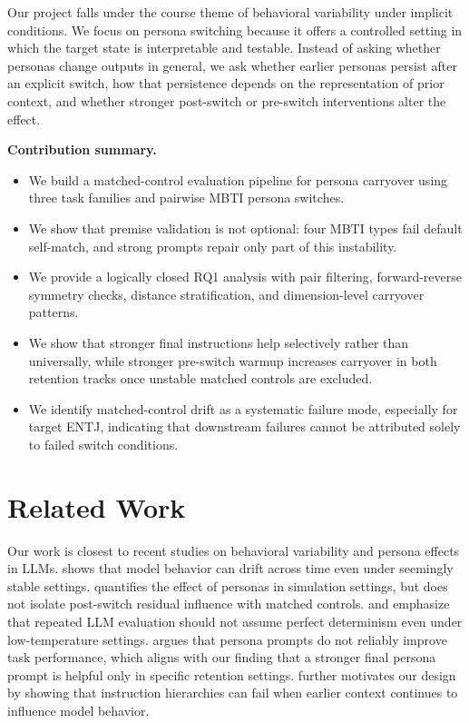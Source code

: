 \documentclass[11pt]{article}
\begin{document}
Our project falls under the course theme of behavioral variability under implicit conditions.
We focus on persona switching because it offers a controlled setting in which the target state is interpretable and testable.
Instead of asking whether personas change outputs in general, we ask whether earlier personas persist after an explicit switch, how that persistence depends on the representation of prior context, and whether stronger post-switch or pre-switch interventions alter the effect.

\textbf{Contribution summary.}
\begin{itemize}[leftmargin=*]
    \item We build a matched-control evaluation pipeline for persona carryover using three task families and pairwise MBTI persona switches.
    \item We show that premise validation is not optional: four MBTI types fail default self-match, and strong prompts repair only part of this instability.
    \item We provide a logically closed RQ1 analysis with pair filtering, forward-reverse symmetry checks, distance stratification, and dimension-level carryover patterns.
    \item We show that stronger final instructions help selectively rather than universally, while stronger pre-switch warmup increases carryover in both retention tracks once unstable matched controls are excluded.
    \item We identify matched-control drift as a systematic failure mode, especially for target ENTJ, indicating that downstream failures cannot be attributed solely to failed switch conditions.
\end{itemize}

\section{Related Work}

Our work is closest to recent studies on behavioral variability and persona effects in LLMs.
\cite{chen2023behavior} shows that model behavior can drift across time even under seemingly stable settings.
\cite{persona2024quantifying} quantifies the effect of personas in simulation settings, but does not isolate post-switch residual influence with matched controls.
\cite{greedy2024nondeterminism} and \cite{deterministic2025nondeterminism} emphasize that repeated LLM evaluation should not assume perfect determinism even under low-temperature settings.
\cite{helpful2024personas} argues that persona prompts do not reliably improve task performance, which aligns with our finding that a stronger final persona prompt is helpful only in specific retention settings.
\cite{control2025illusion} further motivates our design by showing that instruction hierarchies can fail when earlier context continues to influence model behavior.
\end{document}
